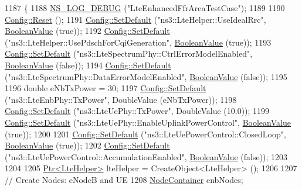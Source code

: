 \begin{DoxyCode}
1187 \{
1188   \hyperlink{group__logging_ga413f1886406d49f59a6a0a89b77b4d0a}{NS\_LOG\_DEBUG} (\textcolor{stringliteral}{"LteEnhancedFfrAreaTestCase"});
1189 
1190   \hyperlink{group__config_ga2c1b65724f42f8c72276d7e7ad6df6db}{Config::Reset} ();
1191   \hyperlink{group__config_ga2e7882df849d8ba4aaad31c934c40c06}{Config::SetDefault} (\textcolor{stringliteral}{"ns3::LteHelper::UseIdealRrc"}, 
      \hyperlink{classns3_1_1BooleanValue}{BooleanValue} (\textcolor{keyword}{true}));
1192   \hyperlink{group__config_ga2e7882df849d8ba4aaad31c934c40c06}{Config::SetDefault} (\textcolor{stringliteral}{"ns3::LteHelper::UsePdschForCqiGeneration"}, 
      \hyperlink{classns3_1_1BooleanValue}{BooleanValue} (\textcolor{keyword}{true}));
1193   \hyperlink{group__config_ga2e7882df849d8ba4aaad31c934c40c06}{Config::SetDefault} (\textcolor{stringliteral}{"ns3::LteSpectrumPhy::CtrlErrorModelEnabled"}, 
      \hyperlink{classns3_1_1BooleanValue}{BooleanValue} (\textcolor{keyword}{false}));
1194   \hyperlink{group__config_ga2e7882df849d8ba4aaad31c934c40c06}{Config::SetDefault} (\textcolor{stringliteral}{"ns3::LteSpectrumPhy::DataErrorModelEnabled"}, 
      \hyperlink{classns3_1_1BooleanValue}{BooleanValue} (\textcolor{keyword}{false}));
1195 
1196   \textcolor{keywordtype}{double} eNbTxPower = 30;
1197   \hyperlink{group__config_ga2e7882df849d8ba4aaad31c934c40c06}{Config::SetDefault} (\textcolor{stringliteral}{"ns3::LteEnbPhy::TxPower"}, DoubleValue (eNbTxPower));
1198   \hyperlink{group__config_ga2e7882df849d8ba4aaad31c934c40c06}{Config::SetDefault} (\textcolor{stringliteral}{"ns3::LteUePhy::TxPower"}, DoubleValue (10.0));
1199   \hyperlink{group__config_ga2e7882df849d8ba4aaad31c934c40c06}{Config::SetDefault} (\textcolor{stringliteral}{"ns3::LteUePhy::EnableUplinkPowerControl"}, 
      \hyperlink{classns3_1_1BooleanValue}{BooleanValue} (\textcolor{keyword}{true}));
1200 
1201   \hyperlink{group__config_ga2e7882df849d8ba4aaad31c934c40c06}{Config::SetDefault} (\textcolor{stringliteral}{"ns3::LteUePowerControl::ClosedLoop"}, 
      \hyperlink{classns3_1_1BooleanValue}{BooleanValue} (\textcolor{keyword}{true}));
1202   \hyperlink{group__config_ga2e7882df849d8ba4aaad31c934c40c06}{Config::SetDefault} (\textcolor{stringliteral}{"ns3::LteUePowerControl::AccumulationEnabled"}, 
      \hyperlink{classns3_1_1BooleanValue}{BooleanValue} (\textcolor{keyword}{false}));
1203 
1204 
1205   \hyperlink{classns3_1_1Ptr}{Ptr<LteHelper>} lteHelper = CreateObject<LteHelper> ();
1206 
1207   \textcolor{comment}{// Create Nodes: eNodeB and UE}
1208   \hyperlink{classns3_1_1NodeContainer}{NodeContainer} enbNodes;

\end{DoxyCode}
